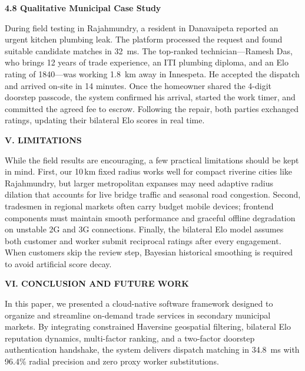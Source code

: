 \documentclass[10pt,twocolumn,a4paper]{article}
\begin{document}
\vspace{0.8em}
\noindent
\textbf{4.8 Qualitative Municipal Case Study}

During field testing in Rajahmundry, a resident in Danavaipeta reported an urgent kitchen plumbing leak. The platform processed the request and found suitable candidate matches in 32~ms. The top-ranked technician---Ramesh Das, who brings 12 years of trade experience, an ITI plumbing diploma, and an Elo rating of 1840---was working 1.8~km away in Innespeta. He accepted the dispatch and arrived on-site in 14 minutes. Once the homeowner shared the 4-digit doorstep passcode, the system confirmed his arrival, started the work timer, and committed the agreed fee to escrow. Following the repair, both parties exchanged ratings, updating their bilateral Elo scores in real time.

\vspace{1.2em}
\noindent
\textbf{\large V. LIMITATIONS}

\vspace{0.5em}
While the field results are encouraging, a few practical limitations should be kept in mind. First, our 10\,km fixed radius works well for compact riverine cities like Rajahmundry, but larger metropolitan expanses may need adaptive radius dilation that accounts for live bridge traffic and seasonal road congestion. Second, tradesmen in regional markets often carry budget mobile devices; frontend components must maintain smooth performance and graceful offline degradation on unstable 2G and 3G connections. Finally, the bilateral Elo model assumes both customer and worker submit reciprocal ratings after every engagement. When customers skip the review step, Bayesian historical smoothing is required to avoid artificial score decay.

\vspace{1.2em}
\noindent
\textbf{\large VI. CONCLUSION AND FUTURE WORK}

\vspace{0.5em}
In this paper, we presented a cloud-native software framework designed to organize and streamline on-demand trade services in secondary municipal markets. By integrating constrained Haversine geospatial filtering, bilateral Elo reputation dynamics, multi-factor ranking, and a two-factor doorstep authentication handshake, the system delivers dispatch matching in 34.8~ms with 96.4\% radial precision and zero proxy worker substitutions.
\end{document}
